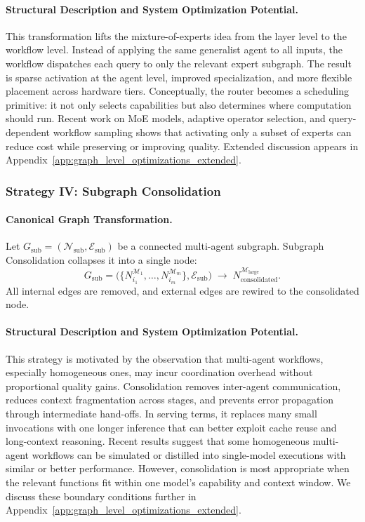 \paragraph{Structural Description and System Optimization Potential.}
This transformation lifts the mixture-of-experts idea from the layer level to the workflow level. Instead of applying the same generalist agent to all inputs, the workflow dispatches each query to only the relevant expert subgraph. The result is sparse activation at the agent level, improved specialization, and more flexible placement across hardware tiers. Conceptually, the router becomes a scheduling primitive: it not only selects capabilities but also determines where computation should run. Recent work on MoE models, adaptive operator selection, and query-dependent workflow sampling shows that activating only a subset of experts can reduce cost while preserving or improving quality. Extended discussion appears in Appendix~\ref{app:graph_level_optimizations_extended}.

\subsubsection{Strategy IV: Subgraph Consolidation}

\paragraph{Canonical Graph Transformation.}
Let $G_{\text{sub}} = (\mathcal{N}_{\text{sub}}, \mathcal{E}_{\text{sub}})$ be a connected multi-agent subgraph. Subgraph Consolidation collapses it into a single node:
\[
G_{\text{sub}} =
\bigl(\{N_{i_1}^{\mathcal{M}_1}, \ldots, N_{i_m}^{\mathcal{M}_m}\}, \mathcal{E}_{\text{sub}}\bigr)
\;\longrightarrow\;
N_{\text{consolidated}}^{\mathcal{M}_{\text{large}}}.
\]
All internal edges are removed, and external edges are rewired to the consolidated node.

\paragraph{Structural Description and System Optimization Potential.}
This strategy is motivated by the observation that multi-agent workflows, especially homogeneous ones, may incur coordination overhead without proportional quality gains. Consolidation removes inter-agent communication, reduces context fragmentation across stages, and prevents error propagation through intermediate hand-offs. In serving terms, it replaces many small invocations with one longer inference that can better exploit cache reuse and long-context reasoning. Recent results suggest that some homogeneous multi-agent workflows can be simulated or distilled into single-model executions with similar or better performance. However, consolidation is most appropriate when the relevant functions fit within one model’s capability and context window. We discuss these boundary conditions further in Appendix~\ref{app:graph_level_optimizations_extended}.


